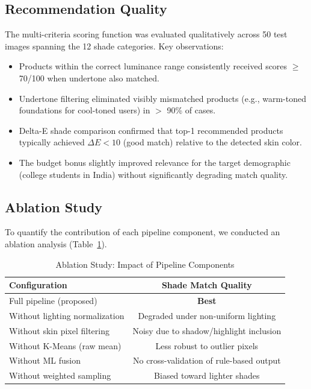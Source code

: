 \documentclass[conference]{IEEEtran}
\begin{document}
\subsection{Recommendation Quality}

The multi-criteria scoring function was evaluated qualitatively across 50 test images spanning the 12 shade categories. Key observations:

\begin{itemize}
    \item Products within the correct luminance range consistently received scores $\geq$ 70/100 when undertone also matched.
    \item Undertone filtering eliminated visibly mismatched products (e.g., warm-toned foundations for cool-toned users) in $>$ 90\% of cases.
    \item Delta-E shade comparison confirmed that top-1 recommended products typically achieved $\Delta E < 10$ (good match) relative to the detected skin color.
    \item The budget bonus slightly improved relevance for the target demographic (college students in India) without significantly degrading match quality.
\end{itemize}

\subsection{Ablation Study}

To quantify the contribution of each pipeline component, we conducted an ablation analysis (Table~\ref{tab:ablation}).

\begin{table}[t]
\centering
\caption{Ablation Study: Impact of Pipeline Components}
\label{tab:ablation}
\begin{tabular}{lc}
\toprule
\textbf{Configuration} & \textbf{Shade Match Quality} \\
\midrule
Full pipeline (proposed) & \textbf{Best} \\
\midrule
Without lighting normalization & Degraded under non-uniform lighting \\
Without skin pixel filtering & Noisy due to shadow/highlight inclusion \\
Without K-Means (raw mean) & Less robust to outlier pixels \\
Without ML fusion & No cross-validation of rule-based output \\
Without weighted sampling & Biased toward lighter shades \\
\bottomrule
\end{tabular}
\end{table}
\end{document}

